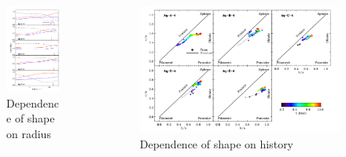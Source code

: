 \documentclass[xcolor=dvipsnames]{beamer}
\begin{document}
\begin{frame}

\begin{columns}[c]

\begin{column}{.4\textwidth}
\begin{figure}
\includegraphics[width=0.8\linewidth]{./pics/shapeRadius.png}
\caption{\tiny Dependence of shape on radius}
\end{figure}
\end{column}

\begin{column}{.7\textwidth}
\centering
\begin{figure}
\includegraphics[width=1\linewidth]{./pics/shapeHistory.png}
\caption{\tiny Dependence of shape on history}
\end{figure}


\end{column}
\end{columns}
\end{frame}
\end{document}
